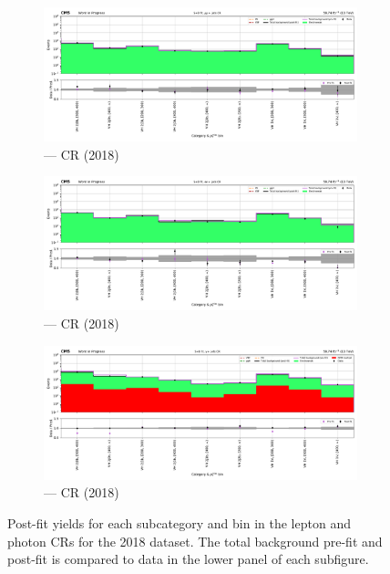 \begin{figure}[htbp]
    \begin{subfigure}[b]{0.49\textwidth}
        \includegraphics[width=\textwidth]{chapters/higgstoinv/figures/mountain_ranges/2018/VH/Zmumu_tree_fit_s-abs_values_VH_cats.pdf}
        \caption{\VH --- \doubleMuCr \gls{CR} (2018)}
    \end{subfigure}
    \hfill
    \begin{subfigure}[b]{0.49\textwidth}
        \includegraphics[width=\textwidth]{chapters/higgstoinv/figures/mountain_ranges/2018/VH/Zee_tree_fit_s-abs_values_VH_cats.pdf}
        \caption{\VH --- \doubleEleCr \gls{CR} (2018)}
    \end{subfigure}

    \begin{subfigure}[b]{0.49\textwidth}
        \includegraphics[width=\textwidth]{chapters/higgstoinv/figures/mountain_ranges/2018/VH/Photon_tree_fit_s-abs_values_VH_cats.pdf}
        \caption{\VH --- \singlePhotonCr \gls{CR} (2018)}
    \end{subfigure}
    \caption[Post-fit yields for each \VH subcategory and \ptmiss bin in the lepton and photon control regions for the 2018 dataset]{Post-fit yields for each \VH subcategory and \ptmiss bin in the lepton and photon \glspl{CR} for the 2018 dataset. The total background pre-fit and post-fit is compared to data in the lower panel of each subfigure.}
    \label{fig:htoinv_mountain_range_VH_2018_CRs}
\end{figure}

